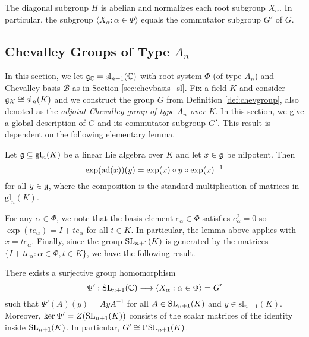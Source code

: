 \begin{cor}
    The diagonal subgroup $H$ is abelian and normalizes each root subgroup $X_\alpha$. In particular, the subgroup $\langle X_\alpha:\alpha\in\Phi\rangle$ equals the commutator subgroup $G'$ of $G$.
\end{cor}

\subsection{Chevalley Groups of Type \texorpdfstring{$A_n$}{PDFstring}}

In this section, we let $\mathfrak{g}_{\mathbb{C}}=\mathrm{sl}_{n+1}(\mathbb{C})$ with root system $\Phi$ (of type $A_n$) and Chevalley basis $\mathcal{B}$ as in Section \ref{sec:chevbasis_sl}. Fix a field $K$ and consider $\mathfrak{g}_K\cong\mathrm{sl}_n(K)$ and we construct the group $G$ from Definition \ref{def:chevgroup}, also denoted as the \textit{adjoint Chevalley group of type $A_n$ over $K$}. In this section, we give a global description of $G$ and its commutator subgroup $G'$. This result is dependent on the following elementary lemma.

\begin{lemma}\label{lem:identityexp}
    Let $\mathfrak{g}\subseteq\mathrm{gl}_n(K)$ be a linear Lie algebra over $K$ and let $x\in\mathfrak{g}$ be nilpotent. Then 
    $$\exp(\mathrm{ad}(x))(y)=\exp(x)\circ y\circ \exp(x)^{-1}$$
    for all $y\in\mathfrak{g}$, where the composition is the standard multiplication of matrices in $\mathrm{gl}_n(K)$.
\end{lemma}

For any $\alpha\in\Phi$, we note that the basis element $e_\alpha\in\Phi$ satisfies $e_\alpha^2=0$ so $\exp(t e_\alpha)=I+t e_\alpha$ for all $t\in K$. In particular, the lemma above applies with $x=t e_\alpha$. Finally, since the group $\mathrm{SL}_{n+1}(K)$ is generated by the matrices $\{I+t e_\alpha:\alpha\in\Phi, t\in K\}$, we have the following result.

\begin{proposition}
    There exists a surjective group homomorphism 
    $$\Psi':\mathrm{SL}_{n+1}(\mathbb{C})\longrightarrow\langle X_\alpha:\alpha\in\Phi\rangle=G'$$
    such that $\Psi'(A)(y)=AyA^{-1}$ for all $A\in\mathrm{SL}_{n+1}(K)$ and $y\in\mathrm{sl}_{n+1}(K)$. Moreover, $\ker\Psi'=Z(\mathrm{SL}_{n+1}(K))$ consists of the scalar matrices of the identity inside $\mathrm{SL}_{n+1}(K)$. In particular, $G'\cong\mathrm{PSL}_{n+1}(K)$.
\end{proposition}